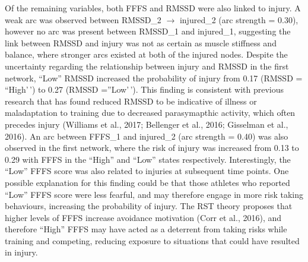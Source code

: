 \documentclass[
  english,
  man]{apa6}
\begin{document}
Of the remaining variables, both FFFS and RMSSD were also linked to injury.
A weak arc was observed between RMSSD\_2 \(\rightarrow\) injured\_2 (arc strength = 0.30), however no arc was present between RMSSD\_1 and injured\_1, suggesting the link between RMSSD and injury was not as certain as muscle stiffness and balance, where stronger arcs existed at both of the injured nodes.
Despite the uncertainty regarding the relationship between injury and RMSSD in the first network, ``Low'' RMSSD increased the probability of injury from 0.17 (RMSSD = ``High'\,') to 0.27 (RMSSD =''Low'\,').
This finding is consistent with previous research that has found reduced RMSSD to be indicative of illness or maladaptation to training due to decreased parasymapthic activity, which often precedes injury (Williams et al., 2017; Bellenger et al., 2016; Gisselman et al., 2016).
An arc between FFFS\_1 and injured\_2 (arc strength = 0.40) was also observed in the first network, where the risk of injury was increased from 0.13 to 0.29 with FFFS in the ``High'' and ``Low'' states respectively.
Interestingly, the ``Low'' FFFS score was also related to injuries at subsequent time points.
One possible explanation for this finding could be that those athletes who reported ``Low'' FFFS score were less fearful, and may therefore engage in more risk taking behaviours, increasing the probability of injury.
The RST theory proposes that higher levels of FFFS increase avoidance motivation (Corr et al., 2016), and therefore ``High'' FFFS may have acted as a deterrent from taking risks while training and competing, reducing exposure to situations that could have resulted in injury.
\end{document}
